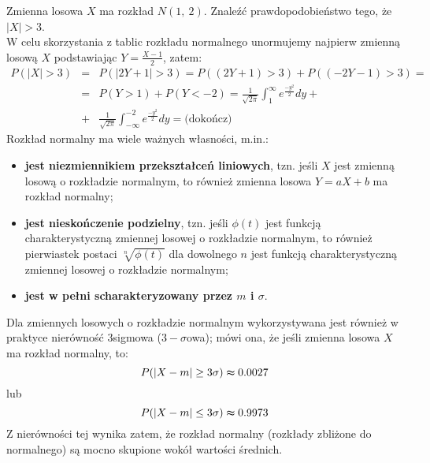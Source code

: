 \documentclass[10pt,a4paper]{article}
\numberwithin{equation}{subsection}
\begin{document}
Zmienna losowa $X$ ma rozkład $N(1,~2)$. Znaleźć prawdopodobieństwo tego, że $|X|>3$. \\
W celu skorzystania  z tablic rozkładu normalnego unormujemy najpierw zmienną losową $X$ podstawiając $Y=\frac{X-1}{2}$, zatem:
\begin{eqnarray} \nonumber
P(|X|>3) &=&P(|2Y+1|>3)=P((2Y+1)>3)+P((-2Y-1)>3)=\\\nonumber
&=&P(Y>1)+P(Y<-2)=\frac{1}{\sqrt{2\pi}}\int_1^\infty e^\frac{-y^2}{2}dy + \\\nonumber
&+&\frac{1}{\sqrt{2\pi}}\int_{-\infty}^{-2} e^\frac{-y^2}{2}dy = \textrm{(dokończ)}
\end{eqnarray}
Rozkład normalny ma wiele ważnych własności, m.in.:
\begin{itemize}
\item \textbf{jest niezmiennikiem przekształceń liniowych}, tzn. jeśli $X$ jest zmienną losową o rozkładzie normalnym, to również zmienna losowa $Y=aX+b$ ma rozkład normalny;
\item \textbf{jest nieskończenie podzielny}, tzn. jeśli $\phi(t)$ jest funkcją charakterystyczną zmiennej losowej o rozkładzie normalnym, to również
pierwiastek postaci $\sqrt[n]{\phi(t)}$ dla dowolnego $n$ jest funkcją charakterystyczną zmiennej losowej o rozkładzie normalnym;
\item \textbf{jest w pełni scharakteryzowany przez $m$ i $\sigma$}.
\end{itemize}
Dla zmiennych losowych o rozkładzie normalnym wykorzystywana jest również w praktyce nierówność 3\dywiz sigmowa ($3-\sigma$\dywiz owa); mówi ona, że jeśli zmienna losowa $X$ ma rozkład normalny, to:
\[ P(|X-m|\geq 3\sigma)\thickapprox 0.0027\]
lub
\[ P(|X-m|\leq 3\sigma)\thickapprox 0.9973 \]
Z nierówności tej wynika zatem, że rozkład normalny (rozkłady zbliżone do normalnego) są mocno skupione wokół wartości średnich.
\end{document}
